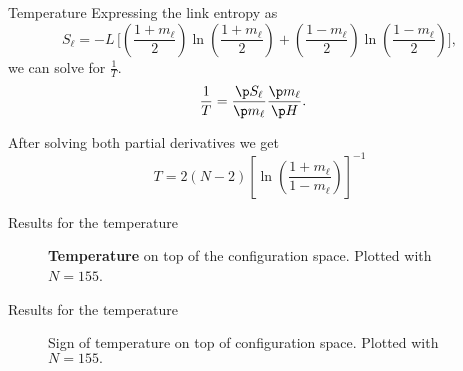 \begin{frame}{Temperature}
Expressing the link entropy as
\begin{equation*}
        S_\ell = - L\, \Biggr[\left(\frac{1+m_\ell}{2}\right) \ln\left(\frac{1+m_\ell}{2}\right) + \left(\frac{1-m_\ell}{2}\right)\ln \left(\frac{1-m_\ell}{2}\right)\Biggr]\label{eq:Sl_m},
\end{equation*}
we can solve for $\frac{1}{T}$. 
\begin{align*}
    \frac{1}{T} &= \frac{\p S_\ell}{\p m_\ell} \frac{\p m_\ell}{\p H}.
\end{align*}

After solving both partial derivatives we get 
\begin{equation}
	T = 2(N-2)\left[\ln \left(\frac{1+m_\ell}{1-m_\ell}\right) \right]^{-1}\label{eq:T_final}
\end{equation}

\end{frame}


\begin{frame}{Results for the temperature}
\vspace{-1mm}
\begin{figure}[h]
    \centering
	\vspace{-1mm}
    \caption{\textbf{Temperature} on top of the configuration space. Plotted with $N=155$.}
    \label{fig:Tps}
\end{figure}
\end{frame}

\begin{frame}{Results for the temperature}
\vspace{-1mm}
\begin{figure}[h]
    \centering
	\vspace{-1mm}
    \caption{Sign of temperature on top of configuration space. Plotted with $N=155.$}
    \label{fig:Tpos-neg}
\end{figure}
\end{frame}



